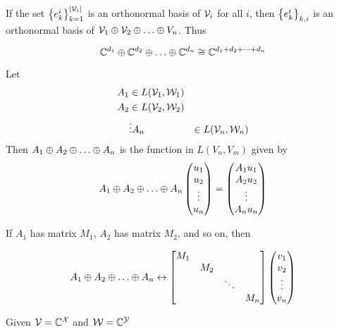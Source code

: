 If the set $\left\lbrace e_k^i\right\rbrace_{k=1}^{\left\lvert\mathcal{V}_i\right\rvert}$ is an orthonormal basis
of $\mathcal{V}_i$ for all $i$, then $\left\lbrace e_k^i\right\rbrace_{k,i}$ is an orthonormal basis
of $\vecspace{V}_1 \directsum \vecspace{V}_2 \directsum \dots \directsum{V}_n$. Thus

\[\complexnums^{d_1} \directsum \complexnums^{d_2} \directsum \dots \directsum \complexnums^{d_n} \isomorphic \complexnums^{d_1 + d_2 + \dots + d_n}\]

\begin{definition}
    Let
    \begin{align*}
        A_1 & \in L(\mathcal{V}_1, \mathcal{W}_1) \\
        A_2 & \in L(\mathcal{V}_2, \mathcal{W}_2) \\
            & \vdots
        A_n & \in L(\mathcal{V}_n, \mathcal{W}_n)
    \end{align*}
    Then $A_1 \directsum A_2 \directsum \dots \directsum A_n$ is the function in $L(V_n, V_m)$ given
    by
    \[A_1 \directsum A_2 \directsum \dots \directsum A_n\begin{pmatrix}u_1\\u_2\\\vdots\\u_n\end{pmatrix} = \begin{pmatrix}A_1u_1\\A_2u_2\\\vdots\\A_nu_n\end{pmatrix}\]
\end{definition}

If $A_1$ has matrix $M_1$, $A_2$ has matrix $M_2$, and so on, then

\[A_1 \directsum A_2 \directsum \dots \directsum A_n \leftrightarrow \begin{bmatrix}M_1\\ &M_2\\ & &\ddots\\ & & & M_n\end{bmatrix}\begin{pmatrix}v_1\\v_2\\\vdots\\v_n\end{pmatrix}\]

\begin{definition}
    Given $\mathcal{V} = \mathbb{C}^{\mathcal{X}}$ and $\mathcal{W} = \mathbb{C}^{\mathcal{Y}}$
\end{definition}